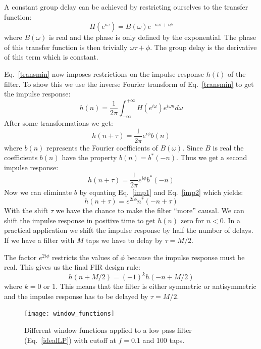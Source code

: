 \documentclass[12pt,a4paper]{article}
\begin{document}
A constant group delay can be achieved by restricting ourselves to
the transfer function:
\begin{equation}
H(e^{i\omega})=B(\omega)e^{-i\omega\tau+i\phi} \label{transmin}
\end{equation}
where $B(\omega)$ is real and the phase is only defined by the exponential.
The phase of this transfer function is then trivially $\omega\tau+\phi$. The
group delay is the derivative of this term which is constant.

Eq.~\ref{transmin} now imposes restrictions on the impulse response $h(t)$
of the filter. To show this we use the inverse Fourier transform of
Eq.~\ref{transmin} to get the impulse response:
\begin{equation}
h(n)=\frac{1}{2\pi}\int_{-\infty}^{+\infty} H(e^{i\omega})
e^{i\omega n}d \omega
\end{equation}
After some transformations we get:
\begin{equation}
h(n+\tau)=\frac{1}{2\pi}e^{i\phi}b(n) \label{imp1}
\end{equation}
where $b(n)$ represents the Fourier coefficients of $B(\omega)$. Since $B$ is
real the coefficients $b(n)$ have the property $b(n)=b^*(-n)$.
Thus we get a second impulse response:
\begin{equation}
h(n+\tau)=\frac{1}{2\pi}e^{i\phi}b^*(-n) \label{imp2}
\end{equation}
Now we can eliminate $b$ by equating Eq.~\ref{imp1} and Eq.~\ref{imp2} which
yields:
\begin{equation}
h(n+\tau)=e^{2i\phi} n^*(-n+\tau)
\end{equation}
With the shift $\tau$ we have the chance to make the filter ``more''
causal. We can shift the impulse response in positive time to get
$h(n)$ zero for $n<0$. In a practical application we shift the impulse
response by half the number of delays. If we have a filter with $M$
taps we have to delay by $\tau=M/2$.

The factor $e^{2i\phi}$ restricts the values of $\phi$ because the impulse
response must be real. This gives us the final FIR design rule:
\begin{equation}
h(n+M/2)=(-1)^k h(-n+M/2)
\end{equation}
where $k=0$ or $1$. This means that the filter is either symmetric or
antisymmetric and the impulse response has to be delayed by $\tau=M/2$.




\begin{figure}[!hbt]
\begin{center}
\mbox{\texttt{[image: window\_functions]}}
\caption{Different window functions applied to a low pass filter 
(Eq.~\ref{idealLP}) 
with cutoff at $f=0.1$ and 100 taps. \label{window_functions}}
\end{center}
\end{figure}
\end{document}
